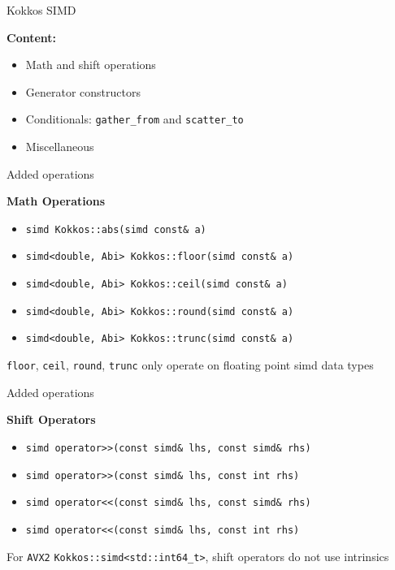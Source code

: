 

\begin{frame}[fragile]

  {\Huge Kokkos SIMD}

  \vspace{10pt}

  \textbf{Content:}
  \begin{itemize}
    \item Math and shift operations 
    \item Generator constructors
    \item Conditionals: \texttt{gather\_from} and \texttt{scatter\_to}
    \item Miscellaneous
  \end{itemize}

\end{frame}


\begin{frame}[fragile]{Added operations}

\textbf{Math Operations}
\bigskip
\begin{itemize}
  \item \texttt{simd Kokkos::abs(simd const\& a)}
  \item \texttt{simd<double, Abi> Kokkos::floor(simd const\& a)}
  \item \texttt{simd<double, Abi> Kokkos::ceil(simd const\& a)}
  \item \texttt{simd<double, Abi> Kokkos::round(simd const\& a)}
  \item \texttt{simd<double, Abi> Kokkos::trunc(simd const\& a)}
\end{itemize}
\bigskip
\texttt{floor}, \texttt{ceil}, \texttt{round}, \texttt{trunc} only operate
on floating point simd data types

\end{frame}


\begin{frame}[fragile]{Added operations}

\textbf{Shift Operators}
\bigskip
\begin{itemize}
  \item \texttt{simd operator>>(const simd\& lhs, const simd\& rhs)}
  \item \texttt{simd operator>>(const simd\& lhs, const int rhs)}
  \item \texttt{simd operator<<(const simd\& lhs, const simd\& rhs)}
  \item \texttt{simd operator<<(const simd\& lhs, const int rhs)}
\end{itemize}
\bigskip
For \texttt{AVX2} \texttt{Kokkos::simd<std::int64\_t>}, shift operators do not
use intrinsics

\end{frame}

